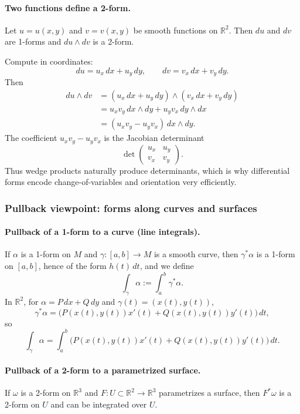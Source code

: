 \documentclass[12pt,a4paper]{article}
\theoremstyle{plain}
\theoremstyle{definition}      %
\begin{document}
\paragraph{Two functions define a 2-form.}
Let $u=u(x,y)$ and $v=v(x,y)$ be smooth functions on $\mathbb{R}^2$. Then $du$ and $dv$ are 1-forms and
$du\wedge dv$ is a 2-form.

Compute in coordinates:
\[
du=u_x\,dx+u_y\,dy,\qquad dv=v_x\,dx+v_y\,dy.
\]
Then
\begin{align*}
	du\wedge dv
	&=(u_x\,dx+u_y\,dy)\wedge(v_x\,dx+v_y\,dy) \\
	&=u_xv_y\,dx\wedge dy + u_yv_x\,dy\wedge dx \\
	&=(u_xv_y-u_yv_x)\,dx\wedge dy.
\end{align*}
The coefficient $u_xv_y-u_yv_x$ is the Jacobian determinant
\[
\det\begin{pmatrix}u_x & u_y\\ v_x & v_y\end{pmatrix}.
\]
Thus wedge products naturally produce determinants, which is why differential forms encode change-of-variables
and orientation very efficiently.

\subsubsection*{Pullback viewpoint: forms along curves and surfaces}

\paragraph{Pullback of a 1-form to a curve (line integrals).}
If $\alpha$ is a 1-form on $M$ and $\gamma:[a,b]\to M$ is a smooth curve, then $\gamma^*\alpha$ is a 1-form on $[a,b]$,
hence of the form $h(t)\,dt$, and we define
\[
\int_\gamma \alpha := \int_a^b \gamma^*\alpha.
\]
In $\mathbb{R}^2$, for $\alpha=P\,dx+Q\,dy$ and $\gamma(t)=(x(t),y(t))$,
\[
\gamma^*\alpha = \big(P(x(t),y(t))x'(t)+Q(x(t),y(t))y'(t)\big)\,dt,
\]
so
\[
\int_\gamma \alpha = \int_a^b \big(P(x(t),y(t))x'(t)+Q(x(t),y(t))y'(t)\big)\,dt.
\]

\paragraph{Pullback of a 2-form to a parametrized surface.}
If $\omega$ is a 2-form on $\mathbb{R}^3$ and $F:U\subset\mathbb{R}^2\to \mathbb{R}^3$ parametrizes a surface,
then $F^*\omega$ is a 2-form on $U$ and can be integrated over $U$.
\end{document}
